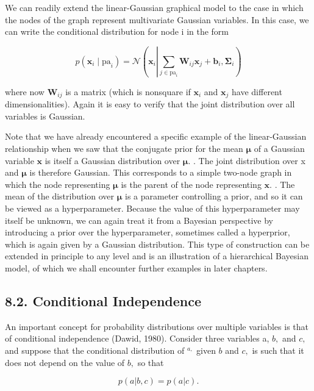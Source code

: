 \documentclass[
  10
]{article}
\begin{document}
We can readily extend the linear-Gaussian graphical model to the case in
which the nodes of the graph represent multivariate Gaussian variables.
In this case, we can write the conditional distribution for node i in
the form

\[
p \left(\mathbf {x} _ {i} \mid \mathrm{pa} _ {i}\right) = \mathcal {N} \left(\mathbf {x} _ {i} \left| \sum_ {j \in \mathrm{pa} _ {i}} \mathbf {W} _ {i j} \mathbf {x} _ {j} + \mathbf {b} _ {i}, \boldsymbol {\Sigma} _ {i}\right) \right.\tag{8.19}
\]

where now \(\mathbf { W } _ { i j }\) is a matrix (which is nonsquare if
\(\mathbf { x } _ { i }\) and \(\mathbf { x } _ { j }\) have different
dimensionalities). Again it is easy to verify that the joint
distribution over all variables is Gaussian.

Note that we have already encountered a specific example of the
linear-Gaussian relationship when we saw that the conjugate prior for
the mean \(\pmb { \mu }\) of a Gaussian variable \(\mathbf { x }\) is
itself a Gaussian distribution over \(\pmb { \mu } .\) . The joint
distribution over x and \(\pmb { \mu }\) is therefore Gaussian. This
corresponds to a simple two-node graph in which the node representing
\(\pmb { \mu }\) is the parent of the node representing
\(\mathbf { x } .\) . The mean of the distribution over \(\pmb { \mu }\)
is a parameter controlling a prior, and so it can be viewed as a
hyperparameter. Because the value of this hyperparameter may itself be
unknown, we can again treat it from a Bayesian perspective by
introducing a prior over the hyperparameter, sometimes called a
hyperprior, which is again given by a Gaussian distribution. This type
of construction can be extended in principle to any level and is an
illustration of a hierarchical Bayesian model, of which we shall
encounter further examples in later chapters.

\subsection{8.2. Conditional
Independence}\label{conditional-independence}

An important concept for probability distributions over multiple
variables is that of conditional independence (Dawid, 1980). Consider
three variables a, \(b ,\) and \(c ,\) and suppose that the conditional
distribution of \(^ { a , }\) given \(b\) and \(c ,\) is such that it
does not depend on the value of \(b ,\) so that

\[
p (a | b, c) = p (a | c).\tag{8.20}
\]
\end{document}
